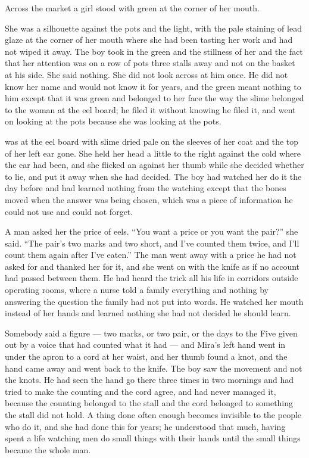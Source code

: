 \scenebreak

Across the market a girl stood with green at the corner of her mouth.

She was a silhouette against the pots and the light, with the pale staining of lead glaze at the corner of her mouth where she had been tasting her work and had not wiped it away. The boy took in the green and the stillness of her and the fact that her attention was on a row of pots three stalls away and not on the basket at his side. She said nothing. She did not look across at him once. He did not know her name and would not know it for years, and the green meant nothing to him except that it was green and belonged to her face the way the slime belonged to the woman at the eel board; he filed it without knowing he filed it, and went on looking at the pots because she was looking at the pots.

 was at the eel board with slime dried pale on the sleeves of her coat and the top of her left ear gone. She held her head a little to the right against the cold where the ear had been, and she flicked an  against her thumb while she decided whether to lie, and put it away when she had decided. The boy had watched her do it the day before and had learned nothing from the watching except that the bones moved when the answer was being chosen, which was a piece of information he could not use and could not forget.

A man asked her the price of eels. “You want a price or you want the pair?” she said. “The pair's two marks and two short, and I've counted them twice, and I'll count them again after I've eaten.” The man went away with a price he had not asked for and thanked her for it, and she went on with the knife as if no account had passed between them. He had heard the trick all his life in corridors outside operating rooms, where a nurse told a family everything and nothing by answering the question the family had not put into words. He watched her mouth instead of her hands and learned nothing she had not decided he should learn.

Somebody said a figure --- two marks, or two pair, or the days to the Five given out by a voice that had counted what it had --- and Mira's left hand went in under the apron to a cord at her waist, and her thumb found a knot, and the hand came away and went back to the knife. The boy saw the movement and not the knots. He had seen the hand go there three times in two mornings and had tried to make the counting and the cord agree, and had never managed it, because the counting belonged to the stall and the cord belonged to something the stall did not hold. A thing done often enough becomes invisible to the people who do it, and she had done this for years; he understood that much, having spent a life watching men do small things with their hands until the small things became the whole man.

